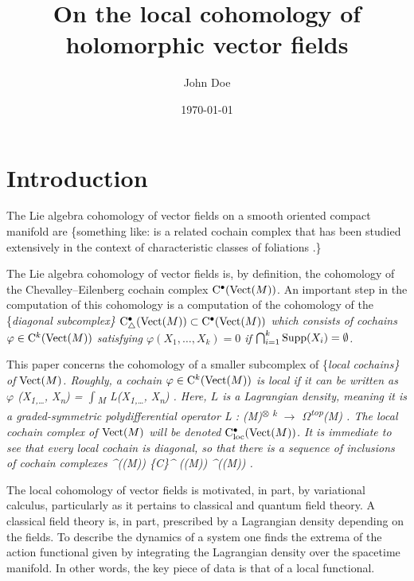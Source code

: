 \documentclass[11pt]{article}
\author{John Doe}
\date{\today}
\title{On the local cohomology of holomorphic vector fields}
\begin{document}
\maketitle
\tableofcontents


\section{Introduction}
\label{sec:org0a5762e}
The Lie algebra cohomology of vector fields on a smooth oriented compact manifold are \brian\{something like: is a related cochain complex that has been studied extensively in the context of characteristic classes of foliations \cite{Fuks, Guillemin, LosikDiag, Bernstein}.\}

The Lie algebra cohomology of vector fields is, by definition, the cohomology of the Chevalley--Eilenberg cochain complex \({\rm C}^\bullet(\operatorname{Vect}(M))\).
An important step in the computation of this cohomology is a computation of the cohomology of the \{\em diagonal subcomplex\} \({\rm C}^\bullet_{\triangle} (\operatorname{Vect}(M)) \subset {\rm C}^\bullet(\operatorname{Vect}(M))\) which consists of cochains \(\varphi \in {\rm C}^k(\operatorname{Vect}(M))\) satisfying \(\varphi(X_1,\ldots,X_k) = 0\) if \(\bigcap_{i=1}^k {\rm Supp}(X_i) = \emptyset\).

This paper concerns the cohomology of a smaller subcomplex of \{\em local cochains\} of \({\rm Vect}(M)\).
Roughly, a cochain \(\varphi \in {\rm C}^k(\operatorname{Vect}(M))\) is local if it can be written as
\beqn
\(\varphi\) (X\textsubscript{1,\dots{}}, X\textsubscript{n}) = \(\int\)\textsubscript{M} L(X\textsubscript{1,\ldots}, X\textsubscript{n}) .
\eeqn
Here, \(L\) is a Lagrangian density, meaning it is a graded-symmetric polydifferential operator
\beqn
L : \Vect(M)\textsuperscript{\(\otimes\) k} \(\to\) \(\Omega\)\textsuperscript{\rm top}(M) .
\eeqn
The local cochain complex of \(\operatorname{Vect}(M)\) will be denoted \({\rm C}_{\rm loc}^\bullet(\operatorname{Vect}(M))\).
It is immediate to see that every local cochain is diagonal, so that there is a sequence of inclusions of cochain complexes
\beqn
\cloc\^{}\bu(\Vect(M)) \hookrightarrow \{\rm C\}\^{}\bu\textsubscript{\triangle} (\Vect(M)) \hookrightarrow \clie\^{}\bu(\Vect(M)) .
\eeqn

The local cohomology of vector fields is motivated, in part, by variational calculus, particularly as it pertains to classical and quantum field theory.
A classical field theory is, in part, prescribed by a Lagrangian density depending on the fields.
To describe the dynamics of a system one finds the extrema of the action functional given by integrating the Lagrangian density over the spacetime manifold.
In other words, the key piece of data is that of a local functional.
\end{document}

